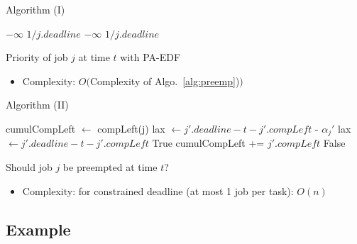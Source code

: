 \documentclass{beamer}
\begin{document}
\begin{frame}{Algorithm (I)}
\begin{algorithm}[H]
    \begin{algorithmic}[1]
                \RETURN $- \infty$
            \ELSE
                \RETURN $1 / j.deadline$
            \ENDIF
                \RETURN $- \infty$
            \ELSE
            \ENDIF
        \ENDIF
        \RETURN $1 / j.deadline$
    \end{algorithmic}
        \caption{Priority of job $j$ at time $t$ with PA-EDF}
        \label{alg:prio}
    \end{algorithm}
    \begin{itemize}
        \item Complexity: $O($Complexity of Algo.~\ref{alg:preemp})$)$
    \end{itemize}
\end{frame}

\begin{frame}{Algorithm (II)}
\begin{algorithm}[H]
    \begin{algorithmic}[1]
    \STATE cumulCompLeft $\leftarrow$ compLeft(j)
            \STATE lax $\leftarrow j'.deadline - t - j'.compLeft$ - $\alpha_j'$
        \ELSE
            \STATE lax $\leftarrow j'.deadline - t - j'.compLeft$
        \ENDIF
            \RETURN True
        \ELSE
            \STATE cumulCompLeft += $j'.compLeft$
        \ENDIF
    \ENDFOR
    \RETURN False
    \end{algorithmic}
        \caption{Should job $j$ be preempted at time $t$?}
        \label{alg:preemp}
    \end{algorithm}
    \begin{itemize}
        \item Complexity: for constrained deadline (at most 1 job per task): $O(n)$
    \end{itemize}
\end{frame}

\subsection{Example}
\end{document}
